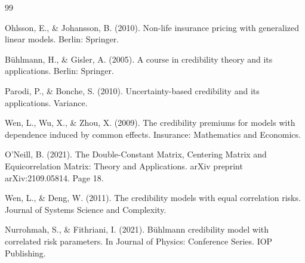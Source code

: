 \documentclass[11pt]{article}
\theoremstyle{definition}
\begin{document}




\newpage
\begin{thebibliography}{99}

Ohlsson, E., \& Johansson, B. (2010). Non-life insurance pricing with generalized linear models. Berlin: Springer.

Bühlmann, H., \& Gisler, A. (2005). A course in credibility theory and its applications. Berlin: Springer.

Parodi, P., \& Bonche, S. (2010). Uncertainty-based credibility and its applications. Variance.

Wen, L., Wu, X., \& Zhou, X. (2009). The credibility premiums for models with dependence induced by common effects. Insurance: Mathematics and Economics.

O'Neill, B. (2021). The Double-Constant Matrix, Centering Matrix and Equicorrelation Matrix: Theory and Applications. arXiv preprint arXiv:2109.05814. Page 18.

Wen, L., \& Deng, W. (2011). The credibility models with equal correlation risks. Journal of Systems Science and Complexity.

Nurrohmah, S., \& Fithriani, I. (2021). Bühlmann credibility model with correlated risk parameters. In Journal of Physics: Conference Series. IOP Publishing.

\end{thebibliography}


\end{document}
